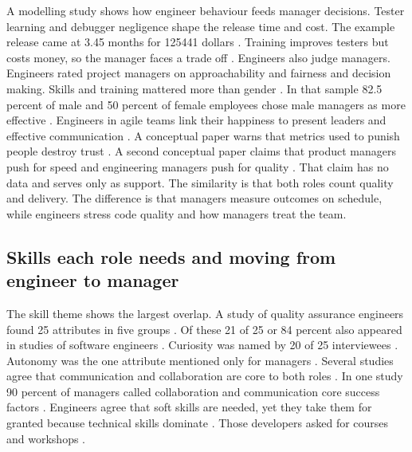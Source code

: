 \documentclass[conference]{IEEEtran}
\begin{document}
A modelling study shows how engineer behaviour feeds manager decisions. Tester learning and debugger negligence shape the release time and cost. The example release came at 3.45 months for 125441 dollars \cite{yeh2024}. Training improves testers but costs money, so the manager faces a trade off \cite{yeh2024}. Engineers also judge managers. Engineers rated project managers on approachability and fairness and decision making. Skills and training mattered more than gender \cite{qureshi2013}. In that sample 82.5 percent of male and 50 percent of female employees chose male managers as more effective \cite{qureshi2013}. Engineers in agile teams link their happiness to present leaders and effective communication \cite{amorim2020}. A conceptual paper warns that metrics used to punish people destroy trust \cite{kurt2024}. A second conceptual paper claims that product managers push for speed and engineering managers push for quality \cite{babu2025}. That claim has no data and serves only as support. The similarity is that both roles count quality and delivery. The difference is that managers measure outcomes on schedule, while engineers stress code quality and how managers treat the team.

\subsection{Skills each role needs and moving from engineer to manager}

The skill theme shows the largest overlap. A study of quality assurance engineers found 25 attributes in five groups \cite{farias2025}. Of these 21 of 25 or 84 percent also appeared in studies of software engineers \cite{farias2025}. Curiosity was named by 20 of 25 interviewees \cite{farias2025}. Autonomy was the one attribute mentioned only for managers \cite{farias2025}. Several studies agree that communication and collaboration are core to both roles \cite{nguyen2016b,amorim2020,assalaarachchi2025}. In one study 90 percent of managers called collaboration and communication core success factors \cite{nguyen2016b}. Engineers agree that soft skills are needed, yet they take them for granted because technical skills dominate \cite{zoric2018}. Those developers asked for courses and workshops \cite{zoric2018}.
\end{document}
